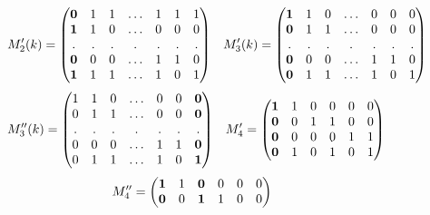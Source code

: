 \documentclass[a4paper,10pt]{report}
\theoremstyle{plain}
\theoremstyle{remark}
\theoremstyle{plain}
\begin{document}
\begin{figure}[h!]
\footnotesize{
	\centering
	\begin{align*}
			M_2'(k) &= \begin{pmatrix}
				\textbf 0 & 1 & 1 & \ldots & 1 & 1 & 1\\
				\textbf 1 & 1& 0 &  \ldots &0 &0 &0\\
				. & . & . & . & . & . & . \\
				\textbf 0 & 0 & 0 & \ldots & 1 & 1 & 0 \\
				\textbf 1 & 1 & 1 & \ldots & 1 & 0 & 1 \\
			\end{pmatrix}
			&
			M_3'(k) &= \begin{pmatrix}
				\textbf 1 & 1 & 0 & \ldots & 0 & 0 & 0 \\
				\textbf 0 & 1 & 1 & \ldots & 0 & 0 & 0 \\
				. & . & . & . & . & . & . \\
				\textbf 0 & 0 & 0 & \ldots & 1 & 1 & 0 \\
				\textbf 0 & 1 & 1 & \ldots & 1 & 0 & 1 \\
			\end{pmatrix}	
	\end{align*}
	\begin{align*}
			M_3''(k) &= \begin{pmatrix}
				1 & 1 & 0 & \ldots & 0 & 0 & \textbf 0 \\
				0 & 1 & 1 & \ldots & 0 & 0 & \textbf 0 \\
				. & . & . & . & . & . & . \\
				0 & 0 & 0 & \ldots & 1 & 1 & \textbf 0 \\
				0 & 1 & 1 & \ldots & 1 & 0 & \textbf 1 \\
			\end{pmatrix}
			&
			M_4' &= \begin{pmatrix}
					\textbf 1 & 1 & 0 & 0 & 0 & 0 \\ 
					\textbf 0 & 0 & 1 & 1 & 0 & 0 \\
					\textbf 0 & 0 & 0 & 0 & 1 & 1 \\
					\textbf 0 & 1 & 0 & 1 & 0 & 1 \\
			\end{pmatrix}
	\end{align*}
	\begin{align*}
			M_4'' &= \begin{pmatrix}
					\textbf 1 & 1 & \textbf 0 & 0 & 0 & 0 \\ 
					\textbf 0 & 0 & \textbf 1 & 1 & 0 & 0 \\

\end{pmatrix}
\end{align*}}
\end{figure}
\end{document}
